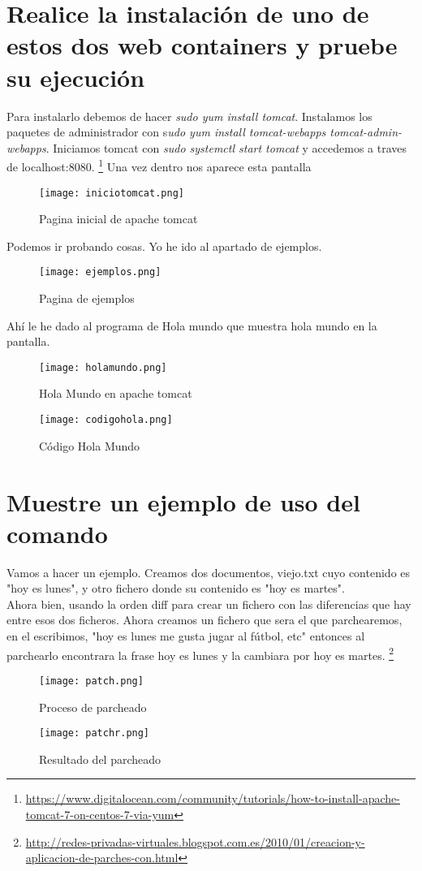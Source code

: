 \section{Realice la instalación de uno de estos dos web containers y pruebe su ejecución}
Para instalarlo debemos de hacer \textit{sudo yum install tomcat}.
Instalamos los paquetes de administrador con s\textit{udo yum install tomcat-webapps tomcat-admin-webapps}.
Iniciamos tomcat con \textit{sudo systemctl start tomcat}
y accedemos a traves de localhost:8080. \footnote{\url{https://www.digitalocean.com/community/tutorials/how-to-install-apache-tomcat-7-on-centos-7-via-yum}}
Una vez dentro nos aparece esta pantalla
\begin{figure}[H] 
\centering
\texttt{[image: iniciotomcat.png]}  
\label{figura29:}
\caption{Pagina inicial de apache tomcat}
\end{figure}

Podemos ir probando cosas. Yo he ido al apartado de ejemplos.
\begin{figure}[H] 
\centering
\texttt{[image: ejemplos.png]}  
\label{figura30:}
\caption{Pagina de ejemplos}
\end{figure}
Ahí le he dado al programa de Hola mundo que muestra hola mundo en la pantalla.
\begin{figure}[H] 
\centering
\texttt{[image: holamundo.png]}  
\label{figura31:}
\caption{Hola Mundo en apache tomcat}
\end{figure}
\begin{figure}[H] 
\centering
\texttt{[image: codigohola.png]}  
\label{figura32:}
\caption{Código Hola Mundo}
\end{figure}
\section{ Muestre un ejemplo de uso del comando}
Vamos a hacer un ejemplo.
Creamos dos documentos, viejo.txt cuyo contenido es "hoy es lunes", y otro fichero donde su contenido es "hoy es martes".
\\Ahora bien, usando la orden diff para crear un fichero con las diferencias que hay entre esos dos ficheros.
Ahora creamos un fichero que sera el que parchearemos, en el escribimos, "hoy es lunes me gusta jugar al fútbol, etc" entonces al parchearlo encontrara la frase hoy es lunes y la cambiara por hoy es martes. \footnote{\url{http://redes-privadas-virtuales.blogspot.com.es/2010/01/creacion-y-aplicacion-de-parches-con.html}}
\begin{figure}[H] 
\centering
\texttt{[image: patch.png]}  
\label{figura33:}
\caption{Proceso de parcheado}
\end{figure}
\begin{figure}[H] 
\centering
\texttt{[image: patchr.png]}  
\label{figura34:}
\caption{Resultado del parcheado}
\end{figure}

